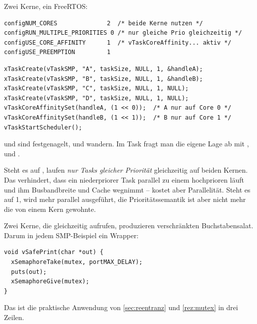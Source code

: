\begin{bsp}
Zwei Kerne, ein FreeRTOS:
\begin{lstlisting}
configNUM_CORES              2  /* beide Kerne nutzen */
configRUN_MULTIPLE_PRIORITIES 0 /* nur gleiche Prio gleichzeitig */
configUSE_CORE_AFFINITY      1  /* vTaskCoreAffinity... aktiv */
configUSE_PREEMPTION         1
\end{lstlisting}
\begin{lstlisting}
xTaskCreate(vTaskSMP, "A", taskSize, NULL, 1, &handleA);
xTaskCreate(vTaskSMP, "B", taskSize, NULL, 1, &handleB);
xTaskCreate(vTaskSMP, "C", taskSize, NULL, 1, NULL);
xTaskCreate(vTaskSMP, "D", taskSize, NULL, 1, NULL);
vTaskCoreAffinitySet(handleA, (1 << 0));  /* A nur auf Core 0 */
vTaskCoreAffinitySet(handleB, (1 << 1));  /* B nur auf Core 1 */
vTaskStartScheduler();
\end{lstlisting}
 und  sind festgenagelt,  und  wandern. Im Task
fragt man die eigene Lage ab mit ,
 und .
\end{bsp}
\begin{falle}
Steht es auf , laufen \emph{nur Tasks gleicher Priorität}
gleichzeitig auf beiden Kernen. Das verhindert, dass ein
niederpriorer Task parallel zu einem hochprioren läuft und ihm
Busbandbreite und Cache wegnimmt -- kostet aber Parallelität. Steht es
auf 1, wird mehr parallel ausgeführt, die Prioritätssemantik ist aber
nicht mehr die von einem Kern gewohnte.
\end{falle}
\begin{falle}
Zwei Kerne, die gleichzeitig  aufrufen, produzieren
verschränkten Buchstabensalat. Darum in jedem SMP-Beispiel ein
Wrapper:
\begin{lstlisting}
void vSafePrint(char *out) {
  xSemaphoreTake(mutex, portMAX_DELAY);
  puts(out);
  xSemaphoreGive(mutex);
}
\end{lstlisting}
Das ist die praktische Anwendung von \ref{sec:reentranz} und
\ref{rez:mutex} in drei Zeilen.
\end{falle}
